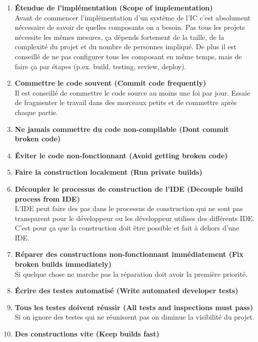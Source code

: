 \begin{enumerate}

\item \textbf{Étendue de l'implémentation (Scope of implementation)}\\
Avant de commencer l'implémentation d'un système de l'IC c'est absolument nécessaire de savoir de quelles composants on a besoin. Pas tous les projets nécessite les mêmes mesures, ça dépends fortement de la taille, de la complexité du projet et du nombre de personnes impliqué. 
De plus il est conseillé de ne pas configurer tous les composant en même temps, mais de faire ça par étapes (p.ex. build, testing, review, deploy). 

\item\textbf{Commettre le code souvent (Commit code frequently)}\\
Il est conseillé de commettre le code source au moins une foi par jour. Essaie de fragmenter le travail dans des morceaux petits et de commettre après chaque partie.

\item\textbf{Ne jamais commettre du code non-compilable (Dont commit broken code)}

\item\textbf{Éviter le code non-fonctionnant (Avoid getting broken code)}

\item\textbf{Faire la construction localement (Run private builds)}

\item\textbf{Découpler le processus de construction de l'IDE (Decouple build process from IDE)}\\
L'IDE peut faire des pas dans le processus de construction qui ne sont pas transparent pour le développeur ou les développeur utilises des différents IDE. C'est pour ça que la construction doit être possible et fait à dehors d'une IDE.

\item\textbf{Réparer des constructions non-fonctionnant immédiatement (Fix broken builds immediately)}\\
Si quelque chose ne marche pas la réparation doit avoir la première priorité.

\item\textbf{Écrire des testes automatisé (Write automated developer tests)}

\item\textbf{Tous les testes doivent réussir (All tests and inspections must pass)}\\
Si on ignore des testes qui ne réunissent pas on diminue la visibilité du projet.

\item\textbf{Des constructions vite (Keep builds fast)}\\

\end{enumerate}



